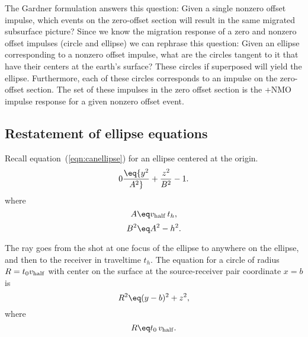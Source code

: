 \par
The Gardner formulation answers this question:
Given a single nonzero offset impulse,
which events on the zero-offset section
will result in the same migrated subsurface picture?
Since we know the migration response
of a zero and nonzero offset impulses (circle and ellipse)
we can rephrase this question:
Given an ellipse corresponding
to a nonzero offset impulse,
what are the circles tangent to it
that have their centers at the earth's surface?
These circles if superposed will yield the ellipse.
Furthermore,
each of these circles corresponds
to an impulse on the zero-offset section.
The set of these impulses in the zero offset section
is the +NMO impulse response for a given nonzero offset event.

\newslide

\subsection{Restatement of ellipse equations}
Recall equation~(\ref{eqn:canellipse})
for an ellipse centered at the origin.
\begin{equation}
        \label{eqn:ellipse}
	0 \eq {y^{2}\over{A^{2}}} + {z^{2}\over{B^{2}}} -1 .
\end{equation}
where
\begin{equation}
        \label{eqn:ellipseA}
	A \eq  \vhalf\, t_h ,
\end{equation}
\begin{equation}
        \label{eqn:ellipseB}
	B^2 \eq A^2 - h^2 .
\end{equation}

The ray goes from the shot at one focus of the ellipse
to anywhere on the ellipse,
and then to the receiver in traveltime $t_h$.
The equation for a circle of radius $R=t_0 v_{\rm half}$
with center on the surface
at the source-receiver pair coordinate $x=b$ is
\begin{equation}
        \label{eqn:circle}
	R^2 \eq (y - b)^2 + z^{2} ,
\end{equation}
\noindent
where
\begin{equation}
	\label{eqn:radius}
        R \eq t_0 \, \vhalf .
\end{equation}

